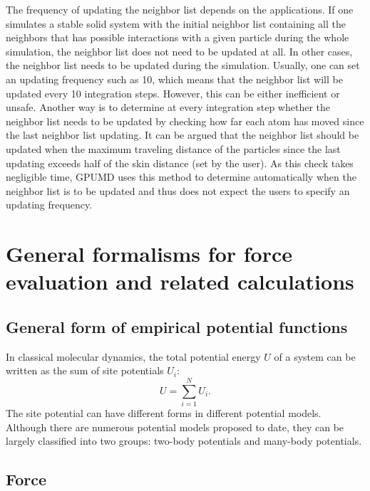 \documentclass[12pt,a4paper]{report}
\begin{document}
The frequency of updating the neighbor list depends on the applications. If one simulates a stable solid system with the initial neighbor list containing all the neighbors that has possible interactions with a given particle during the whole simulation, the neighbor list does not need to be updated at all. In other cases, the neighbor list needs to be updated during the simulation. Usually, one can set an updating frequency such as 10, which means that the neighbor list will be updated every 10 integration steps. However, this can be either inefficient or unsafe. Another way is to determine at every integration step whether the neighbor list needs to be updated by checking how far each atom has moved since the last neighbor list updating. It can be argued that the neighbor list should be updated when the maximum traveling distance of the particles since the last updating exceeds half of the skin distance (set by the user). As this check takes negligible time, GPUMD uses this method to determine automatically when the neighbor list is to be updated and thus does not expect the users to specify an updating frequency.








\section{General formalisms for force evaluation and related calculations}

\subsection{General form of empirical potential functions}


In classical molecular dynamics, the total potential energy $U$ of a system can be written as the sum of site potentials $U_i$:
\begin{equation}
\label{equation:U}
U=\sum_{i=1}^N U_i.
\end{equation}
The site potential can have different forms in different potential models. Although there are numerous potential models proposed to date, they can be largely classified into two groups: two-body potentials and many-body potentials.

\subsection{Force}
\end{document}
